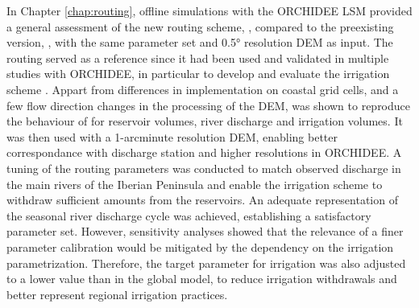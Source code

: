 In Chapter \ref{chap:routing}, offline simulations with the ORCHIDEE LSM provided a general assessment of the new routing scheme, \native, compared to the preexisting version, \std, with the same parameter set and 0.5° resolution DEM as input. The \std routing served as a reference since it had been used and validated in multiple studies with ORCHIDEE, in particular to develop and evaluate the irrigation scheme \citep{arboleda-obando_validation_2024}.
Appart from differences in implementation on coastal grid cells, and a few flow direction changes in the processing of the DEM, \native was shown to reproduce the behaviour of \std for reservoir volumes, river discharge and irrigation volumes.
It was then used with a 1-arcminute resolution DEM, enabling better correspondance with discharge station and higher resolutions in ORCHIDEE. 
A tuning of the routing parameters was conducted to match observed discharge in the main rivers of the Iberian Peninsula and enable the irrigation scheme to withdraw sufficient amounts from the reservoirs.
An adequate representation of the seasonal river discharge cycle was achieved, establishing a satisfactory parameter set. However, sensitivity analyses showed that the relevance of a finer parameter calibration would be mitigated by the dependency on the irrigation parametrization.
Therefore, the target parameter for irrigation was also adjusted to a lower value than in the global model, to reduce irrigation withdrawals and better represent regional irrigation practices.

